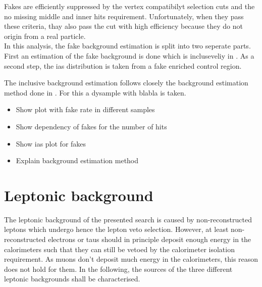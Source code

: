 Fakes are efficiently suppressed by the vertex compatibilyt selection cuts and the no missing middle and inner hits requirement.
Unfortunately, when they pass these criteria, thay also pass the \ecalo cut with high efficiency because they do not origin from a real particle.\\

In this analysis, the fake background estimation is split into two seperate parts.
First an estimation of the fake background is done which is incluseveliy in \ias.
As a second step, the ias distribution is taken from a fake enriched control region.

The inclusive background estimation follows closely the background estimation method done in \cite{blabla}.
For this a dysample with blabla
is taken.

\begin{itemize}
\item Show plot with fake rate in different samples
\item Show dependency of fakes for the number of hits
\item Show ias plot for fakes
\item Explain background estimation method
\end{itemize}

\section{Leptonic background}
\label{sec:LeptonicBkg}

The leptonic background of the presented search is caused by non-reconstructed leptons which undergo hence the lepton veto selection.
However, at least non-reconstructed electrons or taus should in principle deposit enough energy in the calorimeters such that they can still be vetoed by the calorimeter isolation requirement.
As muons don't deposit much energy in the calorimeters, this reason does not hold for them.
In the following, the sources of the three different leptonic backgrounds shall be characterised.

